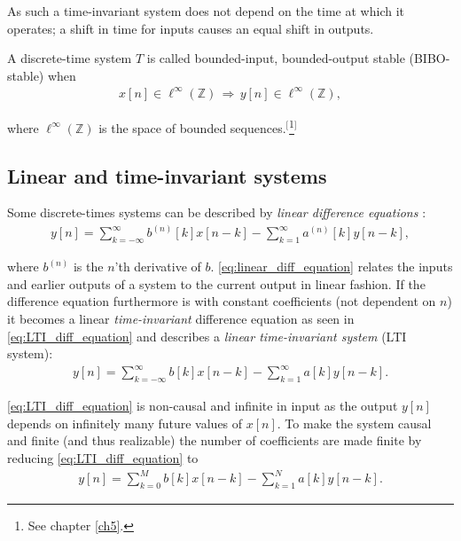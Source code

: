 As such a time-invariant system does not depend on the time at which it operates; a shift in time for inputs causes an equal shift in outputs.

\begin{definition}\label{def:BIBO_stable_system}
A discrete-time system $T$ is called bounded-input, bounded-output stable (BIBO-stable) when
\begin{align}
x[n]\in\ell^{\infty}(\mathbb{Z})\,\Rightarrow\,y[n]\in\ell^{\infty}(\mathbb{Z}),
\end{align}

where $\ell^{\infty}(\mathbb{Z})$ is the space of bounded sequences.$^[$\footnote{See chapter \ref{ch5}.}$^]$
\end{definition}

\subsection{Linear and time-invariant systems}
Some discrete-times systems can be described by \textit{linear difference equations} \cite{page 202, FSP}:
\begin{align} \label{eq:linear_diff_equation}
y[n] = \sum_{k=-\infty}^{\infty} b^{(n)} [k] x[n-k] - \sum_{k=1}^{\infty} a^{(n)} [k] y[n-k],
\end{align}

where $b^{(n)}$ is the $n$'th derivative of $b$. \eqref{eq:linear_diff_equation} relates the inputs and earlier outputs of a system to the current output in linear fashion. If the difference equation furthermore is with constant coefficients (not dependent on $n$) it becomes a linear \textit{time-invariant} difference equation as seen in \eqref{eq:LTI_diff_equation} and describes a \textit{linear time-invariant system} (LTI system):
\begin{align}\label{eq:LTI_diff_equation}
y[n] = \sum_{k=-\infty}^{\infty} b[k] x[n-k] - \sum_{k=1}^{\infty} a[k] y[n-k].
\end{align}

\eqref{eq:LTI_diff_equation} is non-causal and infinite in input as the output $y[n]$ depends on infinitely many future values of $x[n]$. To make the system causal and finite (and thus realizable) the number of coefficients are made finite by reducing \eqref{eq:LTI_diff_equation} to
\begin{align}\label{eq:LTI_diff_equation_finite}
y[n] = \sum_{k=0}^M b[k] x[n-k] - \sum_{k=1}^N a[k] y[n-k].
\end{align}

